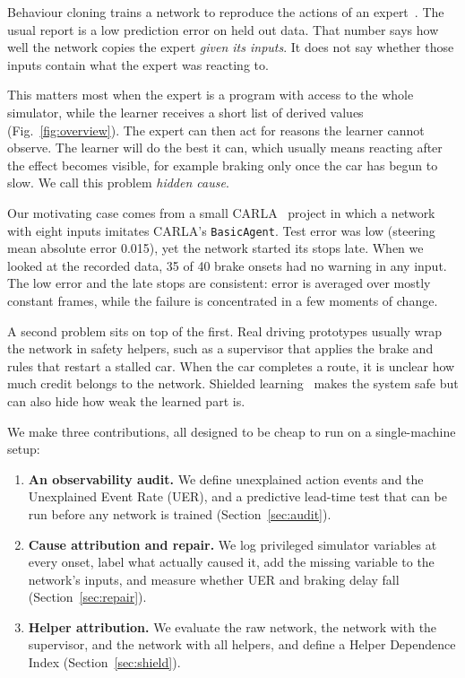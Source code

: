 \documentclass[conference]{IEEEtran}
\begin{document}
Behaviour cloning trains a network to reproduce the actions of an
expert~\cite{bojarski}. The usual report is a low prediction error on
held out data. That number says how well the network copies the expert
\emph{given its inputs}. It does not say whether those inputs contain
what the expert was reacting to.

This matters most when the expert is a program with access to the whole
simulator, while the learner receives a short list of derived values
(Fig.~\ref{fig:overview}).
The expert can then act for reasons the learner cannot observe. The
learner will do the best it can, which usually means reacting after the
effect becomes visible, for example braking only once the car has begun
to slow. We call this problem \emph{hidden cause}.

Our motivating case comes from a small CARLA~\cite{carla} project in
which a network with eight inputs imitates CARLA's \texttt{BasicAgent}.
Test error was low (steering mean absolute error 0.015), yet the network
started its stops late. When we looked at the recorded data, 35 of 40
brake onsets had no warning in any input. The low error and the late
stops are consistent: error is averaged over mostly constant frames,
while the failure is concentrated in a few moments of change.

A second problem sits on top of the first. Real driving prototypes
usually wrap the network in safety helpers, such as a supervisor that
applies the brake and rules that restart a stalled car. When the car
completes a route, it is unclear how much credit belongs to the network.
Shielded learning~\cite{shield} makes the system safe but can also hide
how weak the learned part is.

We make three contributions, all designed to be cheap to run on a
single-machine setup:
\begin{enumerate}
\setlength{\itemsep}{1pt}
\item \textbf{An observability audit.} We define unexplained action
events and the Unexplained Event Rate (UER), and a predictive lead-time
test that can be run before any network is trained (Section~\ref{sec:audit}).
\item \textbf{Cause attribution and repair.} We log privileged simulator
variables at every onset, label what actually caused it, add the missing
variable to the network's inputs, and measure whether UER and braking
delay fall (Section~\ref{sec:repair}).
\item \textbf{Helper attribution.} We evaluate the raw network, the
network with the supervisor, and the network with all helpers, and
define a Helper Dependence Index (Section~\ref{sec:shield}).
\end{enumerate}
\end{document}
